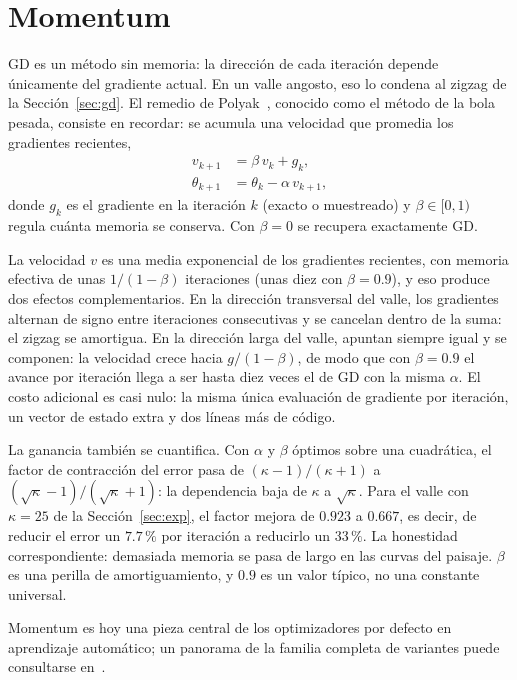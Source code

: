 \section{Momentum}\label{sec:momentum}

GD es un método sin memoria: la dirección de cada iteración depende únicamente del gradiente actual. En un valle angosto, eso lo condena al zigzag de la Sección~\ref{sec:gd}. El remedio de Polyak~\cite{polyak1964}, conocido como el método de la bola pesada, consiste en recordar: se acumula una velocidad que promedia los gradientes recientes,
\begin{align}
  v_{k+1} &= \beta\, v_k + g_k, \label{eq:momentum-v}\\
  \theta_{k+1} &= \theta_k - \alpha\, v_{k+1}, \label{eq:momentum-theta}
\end{align}
donde $g_k$ es el gradiente en la iteración $k$ (exacto o muestreado) y $\beta \in [0, 1)$ regula cuánta memoria se conserva. Con $\beta = 0$ se recupera exactamente GD.

La velocidad $v$ es una media exponencial de los gradientes recientes, con memoria efectiva de unas $1/(1-\beta)$ iteraciones (unas diez con $\beta = 0.9$), y eso produce dos efectos complementarios. En la dirección transversal del valle, los gradientes alternan de signo entre iteraciones consecutivas y se cancelan dentro de la suma: el zigzag se amortigua. En la dirección larga del valle, apuntan siempre igual y se componen: la velocidad crece hacia $g/(1-\beta)$, de modo que con $\beta = 0.9$ el avance por iteración llega a ser hasta diez veces el de GD con la misma $\alpha$. El costo adicional es casi nulo: la misma única evaluación de gradiente por iteración, un vector de estado extra y dos líneas más de código.

La ganancia también se cuantifica. Con $\alpha$ y $\beta$ óptimos sobre una cuadrática, el factor de contracción del error pasa de $(\kappa-1)/(\kappa+1)$ a $(\sqrt{\kappa}-1)/(\sqrt{\kappa}+1)$: la dependencia baja de $\kappa$ a $\sqrt{\kappa}$. Para el valle con $\kappa = 25$ de la Sección~\ref{sec:exp}, el factor mejora de $0.923$ a $0.667$, es decir, de reducir el error un $7.7\,\%$ por iteración a reducirlo un $33\,\%$. La honestidad correspondiente: demasiada memoria se pasa de largo en las curvas del paisaje. $\beta$ es una perilla de amortiguamiento, y $0.9$ es un valor típico, no una constante universal.

Momentum es hoy una pieza central de los optimizadores por defecto en aprendizaje automático; un panorama de la familia completa de variantes puede consultarse en~\cite{ruder2016}.
